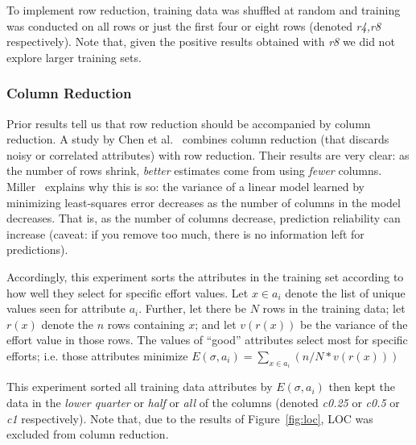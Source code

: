 \documentclass[smallcondesed]{svjour3}
\newcommand{\fig}[1]{Figure~\ref{fig:#1}}
\begin{document}
To implement  row reduction, training data was
shuffled at random and training was conducted on
all rows or  just the first four or eight  rows
(denoted {\em r4,r8} respectively). Note that, given  the positive
results obtained with {\em r8} we did not explore larger training sets.



\subsubsection{Column Reduction}\label{sect:pruner}

Prior results tell us that row reduction should be
accompanied by column reduction.  A study by Chen et
al.~\cite{chen05a} combines column reduction (that
discards noisy or correlated attributes) with row
reduction. Their results are very clear: as the
number of rows shrink, {\em better} estimates come
from using {\em fewer}
columns. Miller~\cite{miller02} explains  why this is so:  the variance of a
linear model learned by minimizing least-squares error decreases as the number of columns in the model
decreases. That is, as the number of columns decrease,
prediction reliability can increase (caveat: 
if you remove too much,
there is no information left for predictions).

Accordingly, this experiment sorts the attributes in the training set according
to how well they select for specific effort values. 
Let $x\in a_i$ denote the list of unique values seen for attribute $a_i$. Further,
let there be $N$ rows in the training data; 
let  $r(x)$ denote the $n$ rows containing $x$; and let $v(r(x))$ be the variance
of the effort value in those rows. The values of ``good'' attributes
select most for specific efforts; i.e. those attributes minimize
$E(\sigma,a_i) =\sum_{x\in a_i} \left(n/N * v(r(x))\right)$

This experiment sorted all training data attributes by $E(\sigma,a_i)$ then kept
the data in the {\em lower quarter} or  {\em half} or {\em all} of  the columns
(denoted {\em c0.25} or {\em c0.5} or {\em c1} respectively).
Note that, due to the results of \fig{loc}, LOC was excluded from column reduction.
\end{document}
